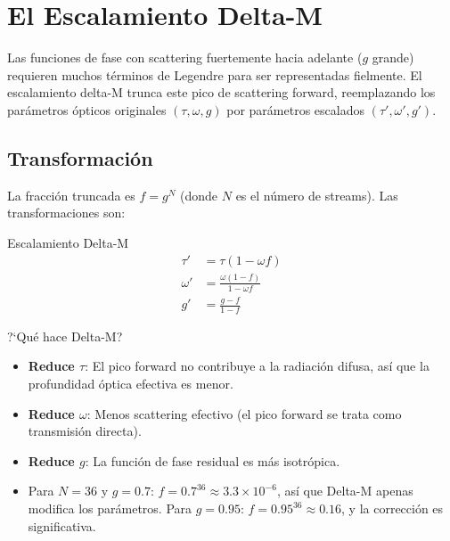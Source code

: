 \documentclass[a4paper,11pt]{article}
\begin{document}
\section{El Escalamiento Delta-M}
\label{sec:delta_m}

Las funciones de fase con scattering fuertemente hacia adelante ($g$ grande) requieren muchos t\'erminos de Legendre para ser representadas fielmente.  El escalamiento delta-M trunca este pico de scattering forward, reemplazando los par\'ametros \'opticos originales $(\tau, \omega, g)$ por par\'ametros escalados $(\tau', \omega', g')$.

\subsection{Transformaci\'on}

La fracci\'on truncada es $f = g^N$ (donde $N$ es el n\'umero de streams). Las transformaciones son:

\begin{keyresult}{Escalamiento Delta-M}
\begin{align}
\tau' &= \tau(1 - \omega f) \label{eq:delta_tau} \\
\omega' &= \frac{\omega(1 - f)}{1 - \omega f} \label{eq:delta_omega} \\
g' &= \frac{g - f}{1 - f} \label{eq:delta_g}
\end{align}
\end{keyresult}

\begin{physics}{?`Qu\'e hace Delta-M?}
\begin{itemize}
\item \textbf{Reduce $\tau$}: El pico forward no contribuye a la radiaci\'on difusa, as\'i que la profundidad \'optica efectiva es menor.
\item \textbf{Reduce $\omega$}: Menos scattering efectivo (el pico forward se trata como transmisi\'on directa).
\item \textbf{Reduce $g$}: La funci\'on de fase residual es m\'as isotr\'opica.
\item Para $N = 36$ y $g = 0.7$: $f = 0.7^{36} \approx 3.3 \times 10^{-6}$, as\'i que Delta-M apenas modifica los par\'ametros. Para $g = 0.95$: $f = 0.95^{36} \approx 0.16$, y la correcci\'on es significativa.
\end{itemize}
\end{physics}
\end{document}
